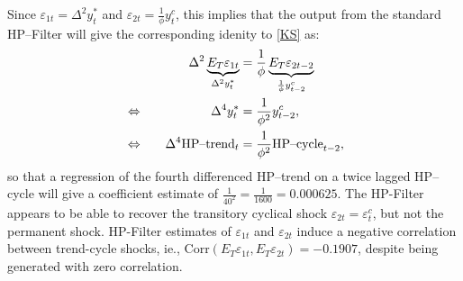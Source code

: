 \documentclass[a4paper,final,12pt]{article}
\begin{document}
Since $\varepsilon _{1t}=\Delta ^{2}y_{t}^{\ast }$ and $\varepsilon _{2t}=%
\frac{1}{\phi }y_{t}^{c}$, this implies that the output from the standard
HP--Filter will give the corresponding idenity to \ref{KS} as:%
\begin{alignat}{2}
& & \Delta ^{2}\underbrace{E_{T}\varepsilon _{1t}}_{\Delta ^{2}y_{t}^{\ast
}}& =\frac{1}{\phi }\underbrace{E_{T}\varepsilon _{2t-2}}_{\frac{1}{\phi }%
y_{t-2}^{c}}  \notag \\
& \Leftrightarrow & \Delta ^{4}y_{t}^{\ast }& =\frac{1}{\phi ^{2}}%
y_{t-2}^{c},  \notag \\
& \Leftrightarrow ~~~ & \Delta ^{4}\text{HP--trend}_{t}& =\frac{1}{\phi ^{2}}%
\text{HP--cycle}_{t-2},  \notag
\end{alignat}%
so that a regression of the fourth differenced HP--trend on a twice lagged
HP--cycle will give a coefficient estimate of $\frac{1}{40^{2}}=\frac{1}{1600%
}=0.000625$. The HP-Filter appears to be able to recover the transitory
cyclical shock $\varepsilon _{2t}=\varepsilon _{t}^{c}$, but not the
permanent shock. HP-Filter estimates of $\varepsilon _{1t}$ and $\varepsilon
_{2t}$ induce a negative correlation between trend-cycle shocks, ie., $%
\mathrm{Corr}(E_{T}\varepsilon _{1t},E_{T}\varepsilon _{2t})=-0.1907$,
despite being generated with zero correlation.

\bigskip

\bigskip

\bigskip

\bigskip

\bigskip

\bigskip

\bigskip

\bigskip

\bigskip

\bigskip

\bigskip

\bigskip

\bigskip

\bigskip
\end{document}
